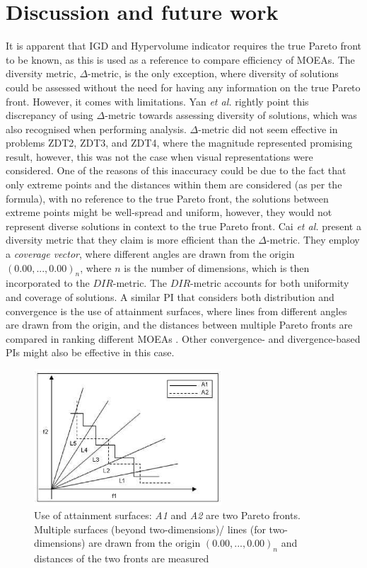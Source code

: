 \documentclass[sigconf, nonacm, preprint]{acmart}
\begin{document}
\section{Discussion and future work}
It is apparent that IGD and Hypervolume indicator requires the true Pareto front to be known, as this is used as a reference to compare efficiency of MOEAs. The diversity metric, $\Delta$-metric, is the only exception, where diversity of solutions could be assessed without the need for having any information on the true Pareto front. However, it comes with limitations. Yan \textit{et al.} \cite{yan2007} rightly point this discrepancy of using $\Delta$-metric towards assessing diversity of solutions, which was also recognised when performing analysis. $\Delta$-metric did not seem effective in problems ZDT2, ZDT3, and ZDT4, where the magnitude represented promising result, however, this was not the case when visual representations were considered. One of the reasons of this inaccuracy could be due to the fact that only extreme points and the distances within them are considered (as per the formula), with no reference to the true Pareto front, the solutions between extreme points might be well-spread and uniform, however, they would not represent diverse solutions in context to the true Pareto front. Cai \textit{et al.} \cite{cai2018} present a diversity metric that they claim is more efficient than the $\Delta$-metric. They employ a \textit{coverage vector}, where different angles are drawn from the origin $(0.00, ..., 0.00)_{n}$, where $n$ is the number of dimensions, which is then incorporated to the $DIR$-metric. The $DIR$-metric accounts for both uniformity and coverage of solutions. A similar PI that considers both distribution and convergence is the use of attainment surfaces, where lines from different angles are drawn from the origin, and the distances between multiple Pareto fronts are compared in ranking different MOEAs \cite{bui2005}. Other convergence- and divergence-based PIs might also be effective in this case. \\
\begin{figure}
\centering
    \includegraphics[width=70mm]{Screenshot 2023-07-21 at 02.11.30.png}
    \caption{Use of attainment surfaces: \textit{A1} and \textit{A2} are two Pareto fronts. Multiple surfaces (beyond two-dimensions)/ lines (for two-dimensions) are drawn from the origin $(0.00,...,0.00)_{n}$ and distances of the two fronts are measured \cite{bui2005}}
    \label{fig:enter-label}
\end{figure}
\end{document}
